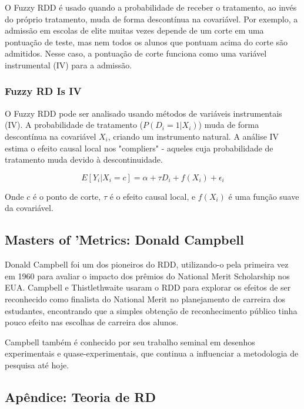 \documentclass[a4paper,12pt]{article}[abntex2]
\begin{document}
O Fuzzy RDD é usado quando a probabilidade de receber o tratamento, ao invés do próprio tratamento, muda de forma descontínua na covariável. Por exemplo, a admissão em escolas de elite muitas vezes depende de um corte em uma pontuação de teste, mas nem todos os alunos que pontuam acima do corte são admitidos. Nesse caso, a pontuação de corte funciona como uma variável instrumental (IV) para a admissão.

\subsubsection*{Fuzzy RD Is IV}

O Fuzzy RDD pode ser analisado usando métodos de variáveis instrumentais (IV). A probabilidade de tratamento (\(P(D_i = 1 | X_i)\)) muda de forma descontínua na covariável \(X_i\), criando um instrumento natural. A análise IV estima o efeito causal local nos "compliers" - aqueles cuja probabilidade de tratamento muda devido à descontinuidade.

\begin{equation}
    E[Y_i | X_i = c] = \alpha + \tau D_i + f(X_i) + \epsilon_i
\end{equation}

Onde \(c\) é o ponto de corte, \(\tau\) é o efeito causal local, e \(f(X_i)\) é uma função suave da covariável.

\subsection*{Masters of 'Metrics: Donald Campbell}

Donald Campbell foi um dos pioneiros do RDD, utilizando-o pela primeira vez em 1960 para avaliar o impacto dos prêmios do National Merit Scholarship nos EUA. Campbell e Thistlethwaite usaram o RDD para explorar os efeitos de ser reconhecido como finalista do National Merit no planejamento de carreira dos estudantes, encontrando que a simples obtenção de reconhecimento público tinha pouco efeito nas escolhas de carreira dos alunos.

Campbell também é conhecido por seu trabalho seminal em desenhos experimentais e quase-experimentais, que continua a influenciar a metodologia de pesquisa até hoje.

\subsection*{Apêndice: Teoria de RD}
\end{document}
